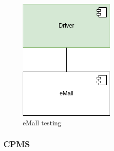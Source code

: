 \begin{figure}[H]
    \centering
    \includegraphics[keepaspectratio]{Testing/emall/emall.png}
    \caption{\ac{eMall} testing}
\end{figure}
\subsubsection{CPMS}

